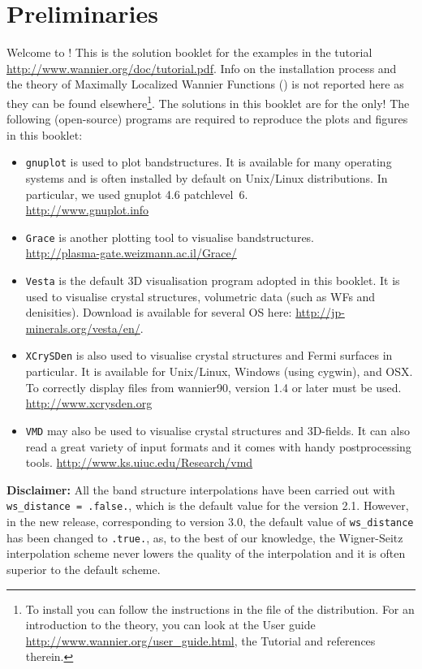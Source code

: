 \section*{Preliminaries}
\label{sec:preliminaries}
Welcome to \Wannier{}! This is the solution booklet for the examples in the \Wannier{} \version{} tutorial \mbox{\url{http://www.wannier.org/doc/tutorial.pdf}}.
Info on the installation process and the theory of Maximally Localized Wannier Functions (\MLWFs) is not reported here as they can be found elsewhere\footnote{\footnotesize{To install \Wannier{} you can follow the instructions in the  file of the \Wannier{} distribution. For an introduction to the theory, you can look at the \Wannier{} User guide \url{http://www.wannier.org/user_guide.html}, the \Wannier{} Tutorial and references therein.}}. The solutions in this booklet are for the \version{} only! The following (open-source) programs are required to reproduce the plots and figures in this booklet:
\begin{itemize}
\item \texttt{gnuplot} is used to plot bandstructures. It is available for many operating systems and is often
installed by default on Unix/Linux distributions. In particular, we used gnuplot 4.6 patchlevel~6.\\
\url{http://www.gnuplot.info}
\item \texttt{Grace} is another plotting tool to visualise bandstructures. \\
\url{http://plasma-gate.weizmann.ac.il/Grace/}
\item \texttt{Vesta} is the default 3D visualisation program\cite{vesta} adopted in this booklet. It is used to visualise crystal structures, volumetric data (such as WFs and  denisities).
Download is available for several OS here: \url{http://jp-minerals.org/vesta/en/}.
\item \texttt{XCrySDen} is also used to visualise crystal structures and Fermi surfaces in particular. It is available
for Unix/Linux, Windows (using cygwin), and OSX. To correctly display files from wannier90,
version 1.4 or later must be used. \\
\url{http://www.xcrysden.org}
\item \texttt{VMD} may also be used to visualise crystal structures and 3D-fields. It can also read a great variety of input formats and it comes with handy postprocessing tools.
\url{http://www.ks.uiuc.edu/Research/vmd}
\end{itemize}

\textbf{Disclaimer:} All the band structure interpolations have been carried out with \mbox{{\tt ws\_distance = .false.}}, which is the default value for the version 2.1. However, in the new \Wannier{} release, corresponding to version 3.0, the default value of {\tt ws\_distance} has been changed to {\tt .true.}, as, to the best of our knowledge, the Wigner-Seitz interpolation scheme never lowers the quality of the interpolation and it is often superior to the default scheme.
